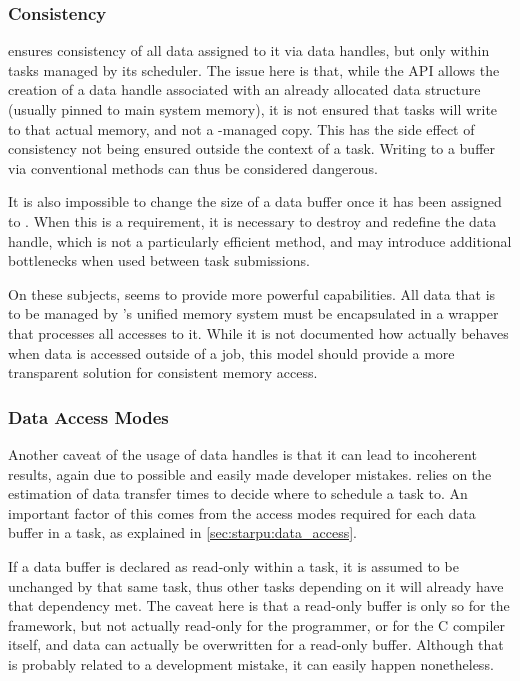 \documentclass[main.tex]{subfiles}
\begin{document}
\subsubsection{Consistency} \label{sec:comparison:consistency}

\starpu ensures consistency of all data assigned to it via data handles, but only within tasks managed by its scheduler. The issue here is that, while the API allows the creation of a data handle associated with an already allocated data structure (usually pinned to main system memory), it is not ensured that tasks will write to that actual memory, and not a \starpu-managed copy. This has the side effect of consistency not being ensured outside the context of a task. Writing to a buffer via conventional methods can thus be considered dangerous.

It is also impossible to change the size of a data buffer once it has been assigned to \starpu. When this is a requirement, it is necessary to destroy and redefine the data handle, which is not a particularly efficient method, and may introduce additional bottlenecks when used between task submissions.

On these subjects, \gama seems to provide more powerful capabilities. All data that is to be managed by \gama's unified memory system must be encapsulated in a wrapper that processes all accesses to it. While it is not documented how \gama actually behaves when data is accessed outside of a job, this model should provide a more transparent solution for consistent memory access.


\subsubsection{Data Access Modes}

Another caveat of the usage of data handles is that it can lead to incoherent results, again due to possible and easily made developer mistakes. \starpu relies on the estimation of data transfer times to decide where to schedule a task to. An important factor of this comes from the access modes required for each data buffer in a task, as explained in \cref{sec:starpu:data_access}.

If a data buffer is declared as read-only within a task, it is assumed to be unchanged by that same task, thus other tasks depending on it will already have that dependency met.
The caveat here is that a read-only buffer is only so for the framework, but not actually read-only for the programmer, or for the C compiler itself, and data can actually be overwritten for a read-only buffer. Although that is probably related to a development mistake, it can easily happen nonetheless.
\end{document}
